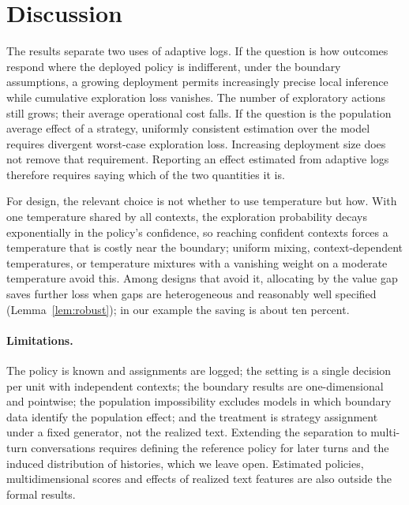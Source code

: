 \documentclass[12pt]{article}
\theoremstyle{definition}
\theoremstyle{remark}
\begin{document}
\begin{table}[htbp]
\centering\small
\tabBoundary
\caption{Boundary inference under common temperature $\tau_n=n^{-\zeta}$.
Coverage is of $\beta_0=c(0)$. Loss is the Monte Carlo mean with the
Theorem~\ref{thm:boundary}(v) constant in parentheses. The last row is a
separate 5,000-replication run.}
\label{tab:boundary}
\end{table}

\section{Discussion}\label{sec:discussion}

The results separate two uses of adaptive logs. If the question is how
outcomes respond where the deployed policy is indifferent, under the boundary assumptions, a growing deployment permits
increasingly precise local inference while cumulative exploration loss
vanishes. The number of exploratory actions still grows; their average
operational cost falls. If the question is the population average effect of a strategy,
uniformly consistent estimation over the model requires divergent
worst-case exploration loss. Increasing deployment size does not remove
that requirement. Reporting an effect estimated from adaptive logs therefore requires saying
which of the two quantities it is.

For design, the relevant choice is not whether to use temperature but how.
With one temperature shared by all contexts, the exploration probability
decays exponentially in the policy's confidence, so reaching confident
contexts forces a temperature that is costly near the boundary; uniform
mixing, context-dependent temperatures, or temperature mixtures with a
vanishing weight on a moderate temperature avoid this. Among designs that
avoid it, allocating by the value gap saves further loss when gaps are
heterogeneous and reasonably well specified (Lemma~\ref{lem:robust}); in our
example the saving is about ten percent.

\paragraph{Limitations.} The policy is known and assignments are logged; the
setting is a single decision per unit with independent contexts; the boundary
results are one-dimensional and pointwise; the population impossibility
excludes models in which boundary data identify the population effect; and
the treatment is strategy assignment under a fixed generator, not the realized
text. Extending the separation to multi-turn conversations requires defining
the reference policy for later turns and the induced distribution of histories,
which we leave open. Estimated policies, multidimensional scores and effects
of realized text features are also outside the formal results.
\end{document}
